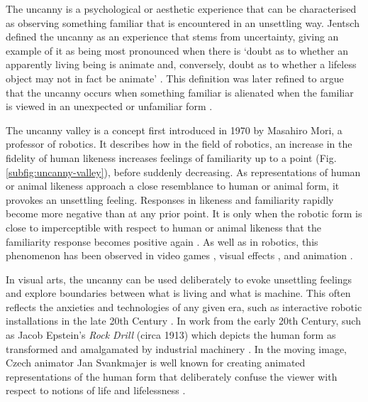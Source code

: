The uncanny is a psychological or aesthetic experience that can be characterised as observing something familiar that is encountered in an unsettling way. 
Jentsch defined the uncanny as an experience that stems from uncertainty, giving an example of it as being most pronounced when there is `doubt as to whether an apparently living being is animate and, conversely, doubt as to whether a lifeless object may not in fact be animate' \citep{jentsch1906psychology}. 
This definition was later refined to argue that the uncanny occurs when something familiar is alienated when the familiar is viewed in an unexpected or unfamiliar form \citep{freud1919uncanny}.

The uncanny valley is a concept first introduced in 1970 by Masahiro Mori, a professor of robotics. 
It describes how in the field of robotics, an increase in the fidelity of human likeness increases feelings of familiarity up to a point  (Fig. \ref{subfig:uncanny-valley}), before suddenly decreasing. 
As representations of human or animal likeness approach a close resemblance to human or animal form, it provokes an unsettling feeling. 
Responses in likeness and familiarity rapidly become more negative than at any prior point. 
It is only when the robotic form is close to imperceptible with respect to human or animal likeness that the familiarity response becomes positive again \citep{mori1970uncanny}. 
As well as in robotics, this phenomenon has been observed in video games \citep{ratajczyk2019uncanny}, visual effects \citep{schwind2018avoiding}, and animation \citep{assaf2020presence}.

In visual arts, the uncanny can be used deliberately to evoke unsettling feelings and explore boundaries between what is living and what is machine. This often reflects the anxieties and technologies of any given era, such as interactive robotic installations in the late 20th Century \citep{tronstad2008uncanny}. 
In work from the early 20th Century, such as Jacob Epstein's \textit{Rock Drill} (circa 1913) which depicts the human form as transformed and amalgamated by industrial machinery \citep{grenville2001uncanny}. 
In the moving image, Czech animator Jan Svankmajer is well known for creating animated representations of the human form that deliberately confuse the viewer with respect to notions of life and lifelessness \citep{chryssouli2019alchemist}.

